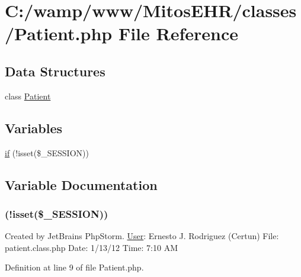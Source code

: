 \hypertarget{_patient_8php}{\section{\-C\-:/wamp/www/\-Mitos\-E\-H\-R/classes/\-Patient.php \-File \-Reference}
\label{_patient_8php}
}
\subsection*{\-Data \-Structures}
\begin{DoxyCompactItemize}
\item 
class \hyperlink{class_patient}{\-Patient}
\end{DoxyCompactItemize}
\subsection*{\-Variables}
\begin{DoxyCompactItemize}
\item 
\hyperlink{_patient_8php_a8ceca98aa29914fd2479a84a8d2242fb}{if} (!isset(\$\-\_\-\-S\-E\-S\-S\-I\-O\-N))
\end{DoxyCompactItemize}


\subsection{\-Variable \-Documentation}
\hypertarget{_patient_8php_a8ceca98aa29914fd2479a84a8d2242fb}{
\subsubsection[{if}]{(!isset(\$\-\_\-\-S\-E\-S\-S\-I\-O\-N))}}\label{_patient_8php_a8ceca98aa29914fd2479a84a8d2242fb}
\-Created by \-Jet\-Brains \-Php\-Storm. \hyperlink{class_user}{\-User}\-: \-Ernesto \-J. \-Rodriguez (\-Certun) \-File\-: patient.\-class.\-php \-Date\-: 1/13/12 \-Time\-: 7\-:10 \-A\-M 

\-Definition at line 9 of file \-Patient.\-php.


